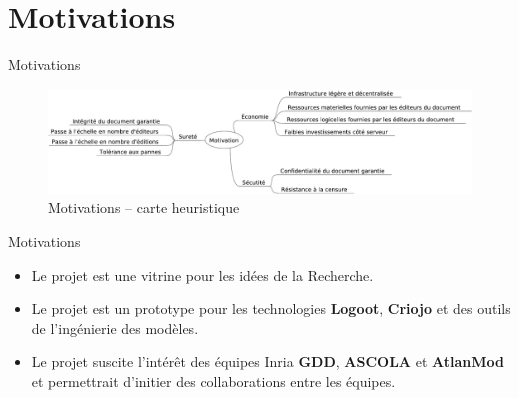 \section{Motivations}
\begin{frame}{Motivations}
  \begin{figure}
    \center
    \includegraphics[width=\textwidth]{includes/motivations.pdf}
    \caption{Motivations -- carte heuristique}
  \end{figure}
\end{frame}
\begin{frame}{Motivations}
  \begin{itemize}
    \item Le projet est une vitrine pour les idées de la Recherche.
    \item Le projet est un prototype pour les technologies \textbf{Logoot},
    \textbf{Criojo} et des outils de l'ingénierie des modèles.
    \item Le projet suscite l'intérêt des équipes Inria \textbf{GDD},
    \textbf{ASCOLA} et \textbf{AtlanMod} et permettrait d'initier des
    collaborations entre les équipes.
  \end{itemize}
\end{frame}

